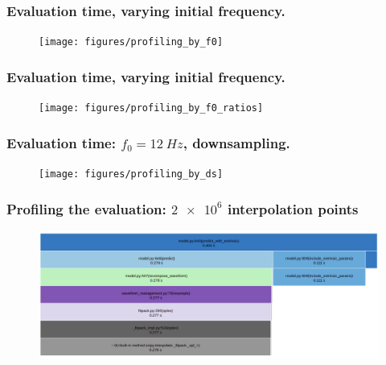 \documentclass{beamer}
\begin{document}
\begin{frame}
    \frametitle{Evaluation time, varying initial frequency.}    
    \begin{figure}[ht]
    \centering
    \texttt{[image: figures/profiling\_by\_f0]}
    \label{fig:profiling_by_f0}
    \end{figure}
\end{frame}

\begin{frame}
    \frametitle{Evaluation time, varying initial frequency.}    
    \begin{figure}[ht]
    \centering
    \texttt{[image: figures/profiling\_by\_f0\_ratios]}
    \label{fig:profiling_by_f0_ratios}
    \end{figure}
\end{frame}



\begin{frame}
    \frametitle{Evaluation time: \(f_0 = \SI{12}{Hz}\), downsampling.}    
    \begin{figure}[ht]
    \centering
    \texttt{[image: figures/profiling\_by\_ds]}
    \label{fig:profiling_by_ds}
    \end{figure}
\end{frame}

\begin{frame}
    \frametitle{Profiling the evaluation: \(\num{2e6}\) interpolation points}
    \begin{figure}[ht]
    \centering
    \includegraphics[width=\textwidth]{figures/profile_12Hz_full}
    \label{fig:profile_12Hz_full}
    \end{figure}
\end{frame}
\end{document}

